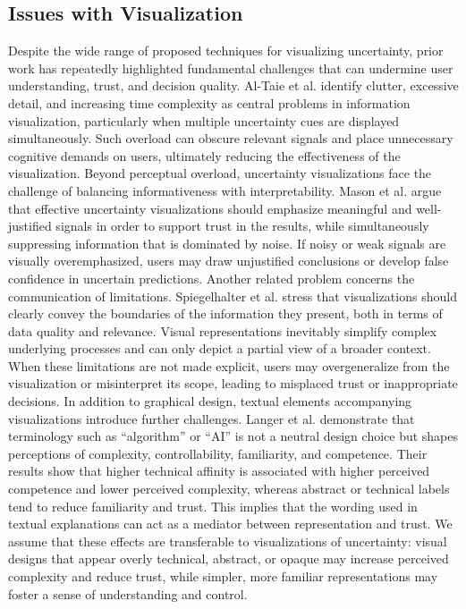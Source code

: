 \documentclass[final,journal,a4paper]{IEEEtran}
\begin{document}
\subsection{Issues with Visualization}
Despite the wide range of proposed techniques for visualizing uncertainty, prior work has repeatedly highlighted fundamental challenges that can undermine user understanding, trust, and decision quality. Al-Taie et al. \cite{Al-Taie2014} identify clutter, excessive detail, and increasing time complexity as central problems in information visualization, particularly when multiple uncertainty cues are displayed simultaneously. Such overload can obscure relevant signals and place unnecessary cognitive demands on users, ultimately reducing the effectiveness of the visualization. Beyond perceptual overload, uncertainty visualizations face the challenge of balancing informativeness with interpretability. Mason et al. \cite{Mason2024} argue that effective uncertainty visualizations should emphasize meaningful and well-justified signals in order to support trust in the results, while simultaneously suppressing information that is dominated by noise. If noisy or weak signals are visually overemphasized, users may draw unjustified conclusions or develop false confidence in uncertain predictions. Another related problem concerns the communication of limitations. Spiegelhalter et al. \cite{Spiegelhalter2011} stress that visualizations should clearly convey the boundaries of the information they present, both in terms of data quality and relevance. Visual representations inevitably simplify complex underlying processes and can only depict a partial view of a broader context. When these limitations are not made explicit, users may overgeneralize from the visualization or misinterpret its scope, leading to misplaced trust or inappropriate decisions. In addition to graphical design, textual elements accompanying visualizations introduce further challenges. Langer et al. \cite{Langer2022} demonstrate that terminology such as ``algorithm'' or ``AI'' is not a neutral design choice but shapes perceptions of complexity, controllability, familiarity, and competence. Their results show that higher technical affinity is associated with higher perceived competence and lower perceived complexity, whereas abstract or technical labels tend to reduce familiarity and trust. This implies that the wording used in textual explanations can act as a mediator between representation and trust. We assume that these effects are transferable to visualizations of uncertainty: visual designs that appear overly technical, abstract, or opaque may increase perceived complexity and reduce trust, while simpler, more familiar representations may foster a sense of understanding and control.
\end{document}
